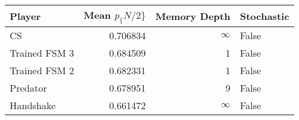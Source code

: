 \begin{tabular}{lrrl}
\toprule
        Player &  Mean $p_\{N/2\}$ &  Memory Depth & Stochastic \\
\midrule
            CS &        0.706834 &            \(\infty\) &      False \\
 Trained FSM 3 &        0.684509 &             1 &      False \\
 Trained FSM 2 &        0.682331 &             1 &      False \\
      Predator &        0.678951 &             9 &      False \\
     Handshake &        0.661472 &            \(\infty\) &      False \\
\bottomrule
\end{tabular}

